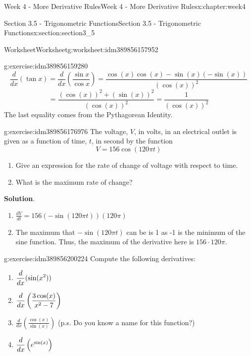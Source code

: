 \documentclass[oneside,10pt,]{book}
\newcommand{\blocktitlefont}{\relax}
\numberwithin{equation}{section}
\begin{document}
\begin{chapterptx}{Week 4 - More Derivative Rules}{}{Week 4 - More Derivative Rules}{}{}{x:chapter:week4}
\begin{sectionptx}{Section 3.5 - Trigonometric Functions}{}{Section 3.5 - Trigonometric Functions}{}{}{x:section:section3_5}
\begin{worksheet-subsection}{Worksheet}{}{Worksheet}{}{}{g:worksheet:idm389856157952}
\begin{divisionexercise}{1}{}{}{g:exercise:idm389856159280}
\begin{equation*}
\frac{d}{dx}\left( \tan x \right) = \frac{d}{dx}\left( \frac{\sin x}{\cos x} \right) = \frac{\cos(x)\cos(x)-\sin(x)(-\sin(x))}{(\cos(x))^2}
\end{equation*}
%
\begin{equation*}
= \frac{(\cos(x))^2+(\sin(x))^2}{(\cos(x))^2} = \frac{1}{(\cos(x))^2} 
\end{equation*}
The last equality comes from the Pythagorean Identity.%
\end{divisionexercise}%
\begin{divisionexercise}{2}{}{}{g:exercise:idm389856176976}%
\footnotemark{} The voltage, \(V\), in volts, in an electrical outlet is given as a function of time, \(t\), in second by the function%
\begin{equation*}
V = 156 \cos(120 \pi t) 
\end{equation*}
%
%
\begin{enumerate}[label=(\alph*)]
\item{}Give an expression for the rate of change of voltage with respect to time.%
\item{}What is the maximum rate of change?%
\end{enumerate}
\textbf{\blocktitlefont Solution}.\hypertarget{g:solution:idm389856178064}{}\quad{}%
\begin{enumerate}[label=(\alph*)]
\item{}\(\displaystyle \frac{dV}{dt} = 156(-\sin(120\pi t))(120\pi)\)%
\item{}The maximum that \(-\sin(120 \pi t)\) can be is 1 as -1 is the minimum of the sine function. Thus, the maximum of the derivative here is \(156\cdot 120\pi\).%
\end{enumerate}
\end{divisionexercise}%
%
\begin{divisionexercise}{3}{}{}{g:exercise:idm389856200224}%
Compute the following derivatives:%
%
\begin{enumerate}[label=(\alph*)]
\item{}\(\displaystyle \displaystyle \frac{d}{dx} (\sin(x^2))\)%
\item{}\(\displaystyle \displaystyle\frac{d}{dx} \left( \frac{3\cos(x)}{x^2-7}\right)\)%
\item{}\(\displaystyle\frac{d}{dx} \left( \frac{\cos(x)}{\sin(x)} \right)\)  (p.s. Do you know a name for this function?)%
\item{}\(\displaystyle \displaystyle\frac{d}{dx} \left( e^{\sin(x)} \right)\)%

\end{enumerate}
\end{divisionexercise}
\end{worksheet-subsection}
\end{sectionptx}
\end{chapterptx}
\end{document}
